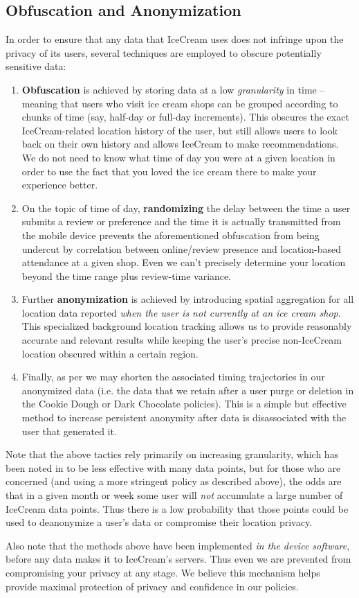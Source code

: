 \documentclass{article}
\providecommand{\tightlist}{
    \setlength{\itemsep}{0pt}\setlength{\parskip}{0pt}
}
\begin{document}
\subsection{Obfuscation and Anonymization}
In order to ensure that any data that IceCream uses does not infringe upon the privacy of its users, several techniques are employed to obscure potentially sensitive data:
\begin{enumerate}\tightlist
  \item \textbf{Obfuscation} is achieved by storing data at a low \textit{granularity} in time -- meaning that users who visit ice cream shops can be grouped according to chunks of time (say, half-day or full-day increments). This obscures the exact IceCream-related location history of the user, but still allows users to look back on their own history and allows IceCream to make recommendations. We do not need to know what time of day you were at a given location in order to use the fact that you loved the ice cream there to make your experience better.
  \item On the topic of time of day, \textbf{randomizing} the delay between the time a user submits a review or preference and the time it is actually transmitted from the mobile device prevents the aforementioned obfuscation from being undercut by correlation between online/review presence and location-based attendance at a given shop. Even we can't precisely determine your location beyond the time range plus review-time variance.
  \item Further \textbf{anonymization} is achieved by introducing spatial aggregation for all location data reported \textit{when the user is not currently at an ice cream shop}. This specialized background location tracking allows us to provide reasonably accurate and relevant results while keeping the user's precise non-IceCream location obscured within a certain region.
  \item Finally, as per \cite{song2014not} we may shorten the associated timing trajectories in our anonymized data (i.e. the data that we retain after a user purge or deletion in the Cookie Dough or Dark Chocolate policies). This is a simple but effective method to increase persistent anonymity after data is disassociated with the user that generated it.
\end{enumerate}

Note that the above tactics rely primarily on increasing granularity, which has been noted in \cite{de2013unique} to be less effective with many data points, but for those who are concerned (and using a more stringent policy as described above), the odds are that in a given month or week some user will \textit{not} accumulate a large number of IceCream data points. Thus there is a low probability that those points could be used to deanonymize a user's data or compromise their location privacy. \par
Also note that the methods above have been implemented \textit{in the device software}, before any data makes it to IceCream's servers. Thus even we are prevented from compromising your privacy at any stage. We believe this mechanism helps provide maximal protection of privacy and confidence in our policies.
\end{document}

